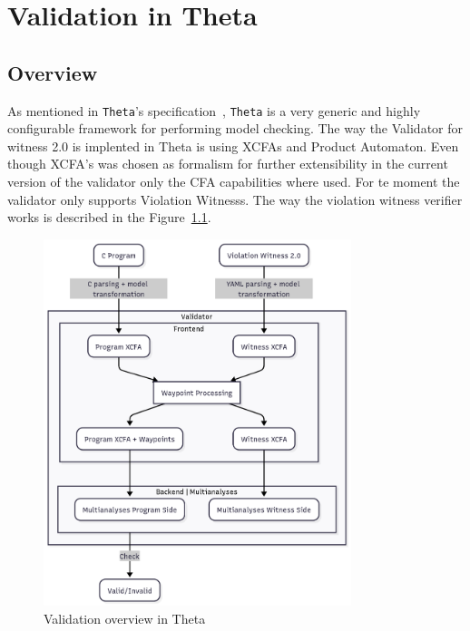 \chapter{Validation in Theta}
\section{Overview}
As mentioned in \texttt{Theta}'s specification~\cite{theta}, \texttt{Theta} is a very generic and
highly configurable framework for performing model checking.
The way the Validator for witness 2.0 is implented in Theta is using XCFAs and Product Automaton. Even though 
XCFA's was chosen as formalism for further extensibility in the current version of the validator only the CFA
capabilities where used. For te moment the validator only supports Violation Witnesss. The way the violation
witness verifier works is described in the Figure~\ref{fig:Validation in Theta}.  


\begin{figure}[h]
    \centering
    \includegraphics[width=0.8\textwidth]{figures/thetaValidator.png}
    \caption{Validation overview in Theta}
    \label{fig:Validation in Theta}
\end{figure}

